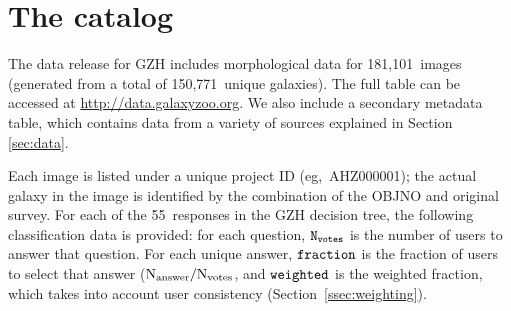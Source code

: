 \documentclass[twocolumn]{aastex6}
\begin{document}
%
%
%
%
%
%
%

\section{The catalog}\label{sec:results}

The data release for GZH includes morphological data for 181,101~images (generated from a total of 150,771~unique galaxies). The full table can be accessed at \url{http://data.galaxyzoo.org}. We also include a secondary metadata table, which contains data from a variety of sources explained in Section \ref{sec:data}.

Each image is listed under a unique project ID (eg,~AHZ000001); the actual galaxy in the image is identified by the combination of the OBJNO and original survey. For each of the 55~responses in the GZH decision tree, the following classification data is provided: for each question, $\tt N_{votes}$ is the number of users to answer that question. For each unique answer, $\tt fraction$ is the fraction of users to select that answer ($\rm N_{answer}/N_{votes}$, and $\tt weighted$ is the weighted fraction, which takes into account user consistency (Section~\ref{ssec:weighting}). 
\end{document}
